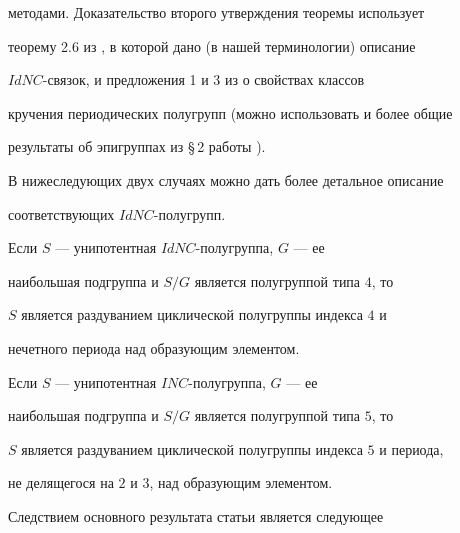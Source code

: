 методами. Доказательство второго утверждения теоремы использует


теорему 2.6 из \cite{2}, в которой дано (в нашей терминологии) описание


$IdNC$-связок, и предложения 1 и 3 из \cite{9} о свойствах классов


кручения периодических полугрупп (можно использовать и более общие


результаты об эпигруппах из \S\,2 работы \cite{10}).





В нижеследующих двух случаях можно дать более детальное описание


соответствующих $IdNC$-полугрупп.





\begin{cor} Если $S$ --- унипотентная $IdNC$-полугруппа, $G$ --- ее


наибольшая подгруппа и $S/G$ является полугруппой типа $4$, то


$S$ является раздуванием циклической полугруппы индекса $4$ и


нечетного периода над образующим элементом.


\end{cor}





\begin{cor} Если $S$ --- унипотентная $INC$-полугруппа, $G$ --- ее


наибольшая подгруппа и $S/G$ является полугруппой типа $5$, то


$S$ является раздуванием циклической полугруппы индекса $5$ и периода,


не делящегося на $2$ и $3$, над образующим элементом.


\end{cor}





Следствием основного результата статьи является следующее





